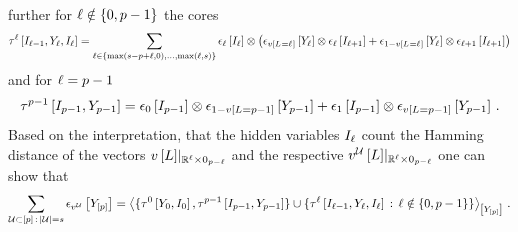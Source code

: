 \begin{example}
\begin{align*}
    \end{align*}
    further for $\ell\notin\{0,p-1\}$ the cores
    \begin{align*}
        \tau^{\ell}\left[I_{\ell-1},Y_{\ell},I_{\ell}\right]
        = \sum_{\ell\in\{\max(s-p+\ell,0),\ldots,\max(\ell,s)\}}
        \epsilon_{\ell}\left[I_{\ell}\right]
        \otimes \left(\epsilon_{v\left[L_{}=\ell_{}\right]}\left[Y_{\ell}\right] \otimes \epsilon_{\ell}\left[I_{\ell+1}\right]
                    + \epsilon_{1-v\left[L_{}=\ell_{}\right]}\left[Y_{\ell}\right] \otimes \epsilon_{\ell+1}\left[I_{\ell+1}\right]
        \right)
    \end{align*}
    and for $\ell=p-1$
    \begin{align*}
        \tau^{p-1}\left[I_{p-1},Y_{p-1}\right]
        = \epsilon_{0}\left[I_{p-1}\right] \otimes \epsilon_{1-v\left[L=p-1\right]}\left[Y_{p-1}\right]
        + \epsilon_{1}\left[I_{p-1}\right] \otimes \epsilon_{v\left[L=p-1\right]}\left[Y_{p-1}\right] \, .
    \end{align*}
    Based on the interpretation, that the hidden variables $I_{\ell}$ count the Hamming distance of the vectors ${v\left[L\right]}|_{\mathbb{R}^{\ell}\times 0_{p-\ell}}$ and the respective ${v^{\mathcal{U}}\left[L\right]}|_{\mathbb{R}^{\ell}\times 0_{p-\ell}}$ one can show that
    \begin{align*}
        \sum_{\mathcal{U}\subset[p] \,:\, \left|\mathcal{U}\right|=s} \epsilon_{v^{\mathcal{U}}}\left[Y_{[p]}\right]
        = \left\langle \{\tau^{0}\left[Y_{0},I_{0}\right],\tau^{p-1}\left[I_{p-1},Y_{p-1}\right]\}\cup\{\tau^{\ell}\left[I_{\ell-1},Y_{\ell},I_{\ell}\right]\,:\,\ell\notin\{0,p-1\}\}\right\rangle_{\left[ Y_{[p]} \right]} \, .
    \end{align*}
\end{example}
